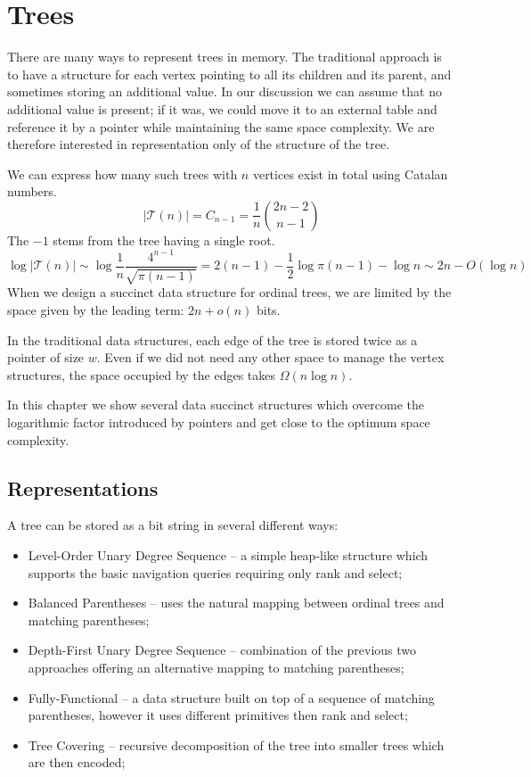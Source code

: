 \chapter{Trees}

There are many ways to represent trees in memory.
The traditional approach is to have a structure for each vertex pointing to all its children and its parent, and sometimes storing an additional value.
In our discussion we can assume that no additional value is present; if it was, we could move it to an external table and reference it by a pointer while maintaining the same space complexity.
We are therefore interested in representation only of the structure of the tree.

We can express how many such trees with $n$ vertices exist in total using Catalan numbers.
$$ | \mathcal{T}(n) | = C_{n-1} = \frac{1}{n} {2n - 2 \choose n - 1} $$
The $-1$ stems from the tree having a single root.
$$ \log | \mathcal{T}(n) | \sim \log \frac{1}{n}\frac{4^{n-1}}{\sqrt{\pi (n-1)}} = 2(n-1) - \frac{1}{2} \log{\pi (n - 1)} - \log n \sim 2n - O(\log n) $$
When we design a succinct data structure for ordinal trees, we are limited by the space given by the leading term: $2n + o(n)$ bits.

In the traditional data structures, each edge of the tree is stored twice as a pointer of size $w$.
Even if we did not need any other space to manage the vertex structures, the space occupied by the edges takes $\Omega (n \log n)$.

In this chapter we show several data succinct structures which overcome the logarithmic factor introduced by pointers and get close to the optimum space complexity.

\section{Representations}

A tree can be stored as a bit string in several different ways:
\begin{itemize}
	\item Level-Order Unary Degree Sequence -- a simple heap-like structure which supports the basic navigation queries requiring only rank and select;
	\item Balanced Parentheses -- uses the natural mapping between ordinal trees and matching parentheses;
	\item Depth-First Unary Degree Sequence -- combination of the previous two approaches offering an alternative mapping to matching parentheses;
	\item Fully-Functional -- a data structure built on top of a sequence of matching parentheses, however it uses different primitives then rank and select;
	\item Tree Covering -- recursive decomposition of the tree into smaller trees which are then encoded;
\end{itemize}

